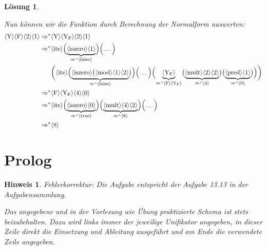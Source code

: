 \documentclass[ngerman,a4paper, 11pt]{scrartcl}
\newcommand{\num}[1]{\ensuremath{\langle \mathrm{#1} \rangle}}
\theoremstyle{break}
\theoremstyle{nonumberplain}
\newtheorem{solution}{Lösung}
\newtheorem{hint}{Hinweis}
\begin{document}
\begin{solution}
\begin{enumerate}[label=(\alph*), leftmargin=*, nolistsep]
		Nun können wir die Funktion durch Berechnung der Normalform auswerten:
		\begin{align*}
		 \num{Y} \num{F} \num{2} \num{1} 
		\Rightarrow^\ast & \num{Y} \num{Y_F} \num{2} \num{1} \\
		\Rightarrow^\ast & \num{ite} \Bigl( \underbrace{\num{iszero} \num{1}}_{\Rightarrow^\ast \num{false}} \Bigr) \Bigl( \dots \Bigr) \\
		& \biggl( \num{ite} \Bigl( \underbrace{\num{iszero} \bigl( \num{mod} \num{1} \num{2} }_{\Rightarrow^\ast \num{false}} \bigr) \Bigr) \Bigl( \dots \Bigr) \Bigl( \underbrace{\num{Y_F}}_{\Rightarrow^\ast \num{F}\num{Y_F}} \bigl( \underbrace{\num{mult} \num{2} \num{2}}_{\Rightarrow^\ast \num{4}} \bigr) \bigl( \underbrace{\num{pred} \num{1}}_{\Rightarrow^\ast \num{0}} \bigr) \Bigr) \biggr) \\
		\Rightarrow^\ast & \num{F} \num{Y_F} \num{4} \num{0} \\
		\Rightarrow^\ast & \num{ite} \Bigl( \underbrace{\num{iszero} \num{0}}_{\Rightarrow^\ast \num{true}} \Bigr) \Bigl( \underbrace{\num{mult} \num{4} \num{2}}_{\Rightarrow^\ast \num{8}} \Bigr) \Bigl( \dots \Bigr) \\
		\Rightarrow^\ast & \num{8}
		\end{align*}
	\end{enumerate}
\end{solution}

\section{Prolog}

\begin{hint}
	Fehlerkorrektur: Die Aufgabe entspricht der Aufgabe 13.13 in der Aufgabensammlung. 
	
	Das angegebene und in der Vorlesung wie Übung praktizierte Schema ist stets beizubehalten. Dazu wird links immer der jeweilige Unifikator angegeben, in dieser Zeile direkt die Einsetzung und Ableitung ausgeführt und am Ende die verwendete Zeile angegeben.
\end{hint}
\end{document}
